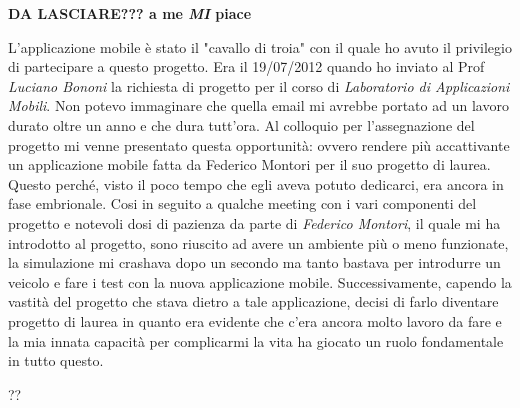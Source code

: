 \textbf{DA LASCIARE??? a me \emph{MI} piace}

L'applicazione mobile è stato il "cavallo di troia" con il quale ho avuto il privilegio di partecipare a questo progetto. Era il 19/07/2012 quando ho inviato al Prof \emph{Luciano Bononi} la richiesta di progetto per il corso di \emph{Laboratorio di Applicazioni Mobili}. Non potevo immaginare che quella email mi avrebbe portato ad un lavoro durato oltre un anno e che dura tutt'ora.
Al colloquio per l'assegnazione del progetto mi venne presentato questa opportunità: ovvero rendere più accattivante un applicazione mobile fatta da Federico Montori per il suo progetto di laurea. Questo perché, visto il poco tempo che egli aveva potuto dedicarci, era ancora in fase embrionale.
Cosi in seguito a qualche meeting con i vari componenti del progetto e notevoli dosi di pazienza da parte di \emph{Federico Montori}, il quale mi ha introdotto al progetto, sono riuscito ad avere un ambiente più o meno funzionate, la simulazione mi crashava dopo un secondo ma tanto bastava per introdurre un veicolo e fare i test con la nuova applicazione mobile.
Successivamente, capendo la vastità del progetto che stava dietro a tale applicazione, decisi di farlo diventare progetto di laurea in quanto era evidente che c'era ancora molto lavoro da fare e la mia innata capacità per complicarmi la vita ha giocato un ruolo fondamentale in tutto questo.

??

